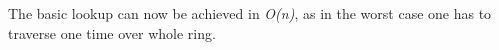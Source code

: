 	The basic lookup can now be achieved in \textit{O(n)},
	as in the worst case one has to traverse one time over whole ring.


